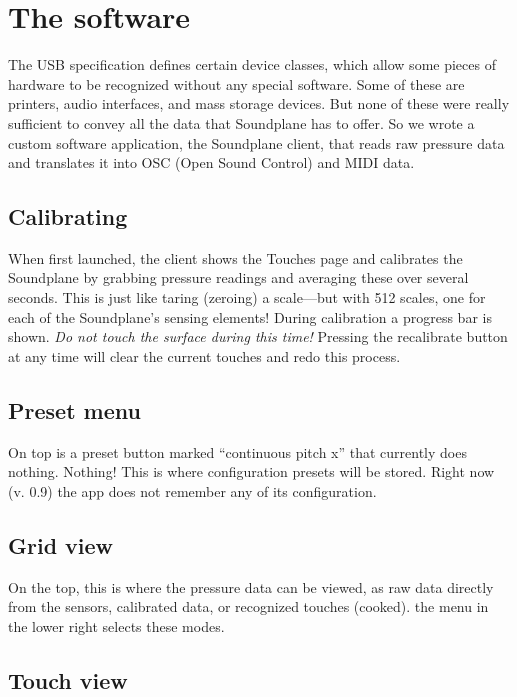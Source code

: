 \chapter{The software}

The USB specification defines certain device classes, which allow some pieces of hardware to be recognized without any special software.  Some of these are printers, audio interfaces, and mass storage devices.  But none of these were really sufficient to convey all the data that Soundplane has to offer.  So we wrote a custom software application, the Soundplane client, that reads raw pressure data and translates it into OSC (Open Sound Control) and MIDI data.   

\section{Calibrating}

When first launched, the client shows the Touches page and calibrates the Soundplane by grabbing pressure readings and averaging these over several seconds.  This is just like taring (zeroing) a scale—but with 512 scales, one for each of the Soundplane’s sensing elements!  During calibration a progress bar is shown.  \emph{Do not touch the surface during this time!}  Pressing the recalibrate button at any time will clear the current touches and redo this process. 

\section{Preset menu}

On top is a preset button marked “continuous pitch x” that currently does nothing.  Nothing!  This is where configuration presets will be stored.  Right now (v. 0.9) the app does not remember any of its configuration.  

\section{Grid view}

On the top, this is where the pressure data can be viewed, as raw data directly from the sensors, calibrated data, or recognized touches (cooked).  the menu in the lower right selects these modes.  

\section{Touch view}

